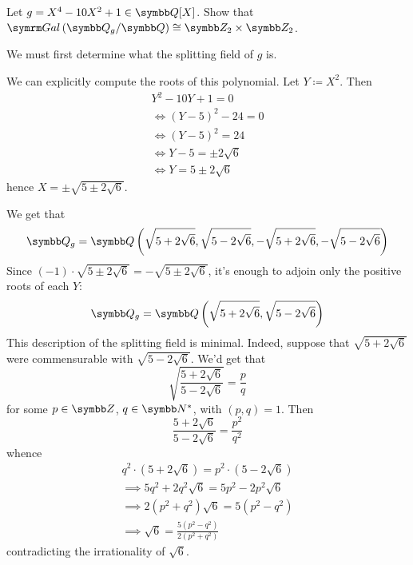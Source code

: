 \begin{exercise}
Let \(g = X^4 - 10 X^2 + 1 \in \rationals[X]\). Show that \(\Gal{\splittingfield{g}}{\rationals} \cong \integersmod{2} \times \integersmod{2}\).
\end{exercise}
\begin{solution}
We must first determine what the splitting field of \(g\) is.

We can explicitly compute the roots of this polynomial. Let \(Y \coloneq X^2\). Then
\begin{gather*}
    Y^2 - 10 Y + 1 = 0 \\
    \iff
    (Y - 5)^2 - 24 = 0 \\
    \iff
    (Y - 5)^2 = 24 \\
    \iff
    Y - 5 = \pm 2 \sqrt{6} \\
    \iff
    Y = 5 \pm 2 \sqrt{6}
\end{gather*}
hence \(X = \pm \sqrt{5 \pm 2 \sqrt{6}}\).

We get that
\[
    \splittingfield{g} = \adjoin{\sqrt{5 + 2 \sqrt{6}}, \sqrt{5 - 2 \sqrt{6}}, -\sqrt{5 + 2 \sqrt{6}}, -\sqrt{5 - 2 \sqrt{6}}}
\]
Since \((-1) \cdot \sqrt{5 \pm 2\sqrt{6}} = -\sqrt{5 \pm 2 \sqrt{6}}\), it's enough to adjoin only the positive roots of each \(Y\):
\[
    \splittingfield{g} = \adjoin{\sqrt{5 + 2 \sqrt{6}}, \sqrt{5 - 2 \sqrt{6}}}
\]
This description of the splitting field is minimal. Indeed, suppose that \(\sqrt{5 + 2 \sqrt{6}}\) were commensurable with \(\sqrt{5 - 2\sqrt{6}}\). We'd get that
\[
    \sqrt{\frac{5 + 2 \sqrt{6}}{5 - 2 \sqrt{6}}} = \frac{p}{q}
\]
for some \(p \in \integers\), \(q \in \naturals^*\), with \((p, q) = 1\). Then
\[
    \frac{5 + 2\sqrt{6}}{5 - 2\sqrt{6}} = \frac{p^2}{q^2}
\]
whence
\begin{gather*}
    q^2 \cdot \left(5 + 2 \sqrt{6}\right) = p^2 \cdot \left(5 - 2 \sqrt{6}\right) \\
    \implies 5 q^2 + 2 q^2 \sqrt{6} = 5 p^2 - 2 p^2 \sqrt{6} \\
    \implies 2 (p^2 + q^2) \sqrt{6} = 5 (p^2 - q^2) \\
    \implies \sqrt{6} = \frac{5 (p^2 - q^2)}{2 (p^2 + q^2)}
\end{gather*}
contradicting the irrationality of \(\sqrt{6}\).


\end{solution}
